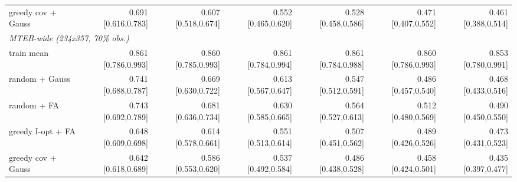 \begin{tabular}{lrrrrrr}
greedy cov + Gauss & 0.691 \scriptsize[0.616,0.783] & 0.607 \scriptsize[0.518,0.674] & 0.552 \scriptsize[0.465,0.620] & 0.528 \scriptsize[0.458,0.586] & 0.471 \scriptsize[0.407,0.552] & 0.461 \scriptsize[0.388,0.514] \\
\multicolumn{7}{l}{\textit{MTEB-wide (234x357, 70\% obs.)}} \\
train mean & 0.861 \scriptsize[0.786,0.993] & 0.860 \scriptsize[0.785,0.993] & 0.861 \scriptsize[0.784,0.994] & 0.861 \scriptsize[0.784,0.988] & 0.860 \scriptsize[0.786,0.993] & 0.853 \scriptsize[0.780,0.991] \\
random + Gauss & 0.741 \scriptsize[0.688,0.787] & 0.669 \scriptsize[0.630,0.722] & 0.613 \scriptsize[0.567,0.647] & 0.547 \scriptsize[0.512,0.591] & 0.486 \scriptsize[0.457,0.540] & 0.468 \scriptsize[0.433,0.516] \\
random + FA & 0.743 \scriptsize[0.692,0.789] & 0.681 \scriptsize[0.636,0.734] & 0.630 \scriptsize[0.585,0.665] & 0.564 \scriptsize[0.527,0.613] & 0.512 \scriptsize[0.480,0.569] & 0.490 \scriptsize[0.450,0.550] \\
greedy I-opt + FA & 0.648 \scriptsize[0.609,0.698] & 0.614 \scriptsize[0.578,0.661] & 0.551 \scriptsize[0.513,0.614] & 0.507 \scriptsize[0.451,0.562] & 0.489 \scriptsize[0.426,0.526] & 0.473 \scriptsize[0.431,0.523] \\
greedy cov + Gauss & 0.642 \scriptsize[0.618,0.689] & 0.586 \scriptsize[0.553,0.620] & 0.537 \scriptsize[0.492,0.584] & 0.486 \scriptsize[0.438,0.528] & 0.458 \scriptsize[0.424,0.501] & 0.435 \scriptsize[0.397,0.477] \\
\bottomrule\end{tabular}
